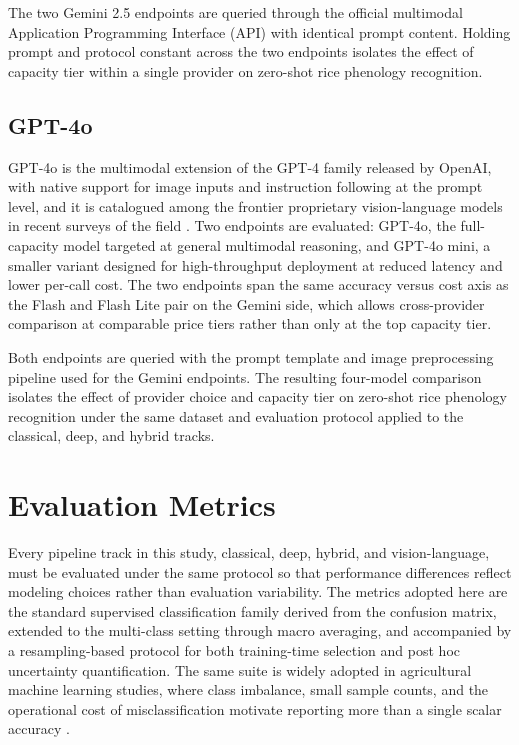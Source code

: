 The two Gemini 2.5 endpoints are queried through the official multimodal Application Programming Interface (API) with identical prompt content. Holding prompt and protocol constant across the two endpoints isolates the effect of capacity tier within a single provider on zero-shot rice phenology recognition.

\subsection{GPT-4o}

GPT-4o is the multimodal extension of the GPT-4 family released by OpenAI, with native support for image inputs and instruction following at the prompt level, and it is catalogued among the frontier proprietary vision-language models in recent surveys of the field \cite{zhang2024vlmsurvey}. Two endpoints are evaluated: GPT-4o, the full-capacity model targeted at general multimodal reasoning, and GPT-4o mini, a smaller variant designed for high-throughput deployment at reduced latency and lower per-call cost. The two endpoints span the same accuracy versus cost axis as the Flash and Flash Lite pair on the Gemini side, which allows cross-provider comparison at comparable price tiers rather than only at the top capacity tier.

Both endpoints are queried with the prompt template and image preprocessing pipeline used for the Gemini endpoints. The resulting four-model comparison isolates the effect of provider choice and capacity tier on zero-shot rice phenology recognition under the same dataset and evaluation protocol applied to the classical, deep, and hybrid tracks.

\section{Evaluation Metrics}

Every pipeline track in this study, classical, deep, hybrid, and vision-language, must be evaluated under the same protocol so that performance differences reflect modeling choices rather than evaluation variability. The metrics adopted here are the standard supervised classification family derived from the confusion matrix, extended to the multi-class setting through macro averaging, and accompanied by a resampling-based protocol for both training-time selection and post hoc uncertainty quantification. The same suite is widely adopted in agricultural machine learning studies, where class imbalance, small sample counts, and the operational cost of misclassification motivate reporting more than a single scalar accuracy \cite{benos2021ml}.


